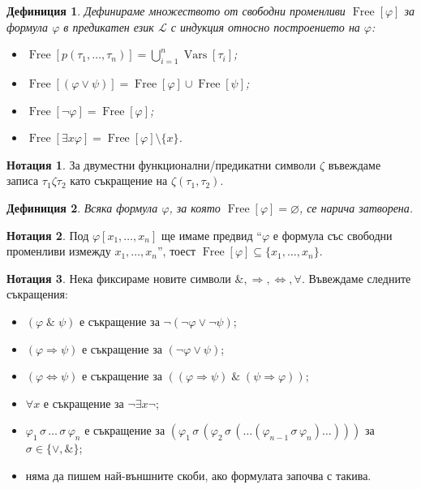 \documentclass[12pt]{article}
\newcommand{\vars}{\operatorname{Vars}}
\newcommand{\free}{\operatorname{Free}}
\newcommand{\logand}{\; \& \;}
\newcommand{\calL}{\mathcal{L}}
\newtheorem*{definition}{Дефиниция}
\theoremstyle{definition}
\newtheorem*{notation}{Нотация}
\begin{document}
\newpage

\begin{definition}
	Дефинираме множеството от свободни променливи $\free[\varphi]$ за формула $\varphi$ в предикатен език $\calL$ с индукция относно построението на $\varphi$:
	\begin{itemize}
		\item $\free[p(\tau_1, \dots, \tau_n)] = \bigcup\limits_{i = 1}^n \vars[\tau_i]$;
		\item $\free[(\varphi \lor \psi)] = \free[\varphi] \cup \free[\psi]$;
		\item $\free[\neg \varphi] = \free[\varphi]$;
		\item $\free[\exists x \varphi] = \free[\varphi] \setminus \{ x \}$.
	\end{itemize}
\end{definition}

\begin{notation}
	За двуместни функционални/предикатни символи $\zeta$ въвеждаме записа $\tau_1 \zeta \tau_2$ като съкращение на $\zeta(\tau_1, \tau_2)$.
\end{notation}

\begin{definition}
	Всяка формула $\varphi$, за която $\free[\varphi] = \varnothing$, се нарича затворена.
\end{definition}

\begin{notation}
	Под $\varphi[x_1, \dots, x_n]$ ще имаме предвид ``$\varphi$ е формула със свободни променливи измежду $x_1, \dots, x_n$'', тоест $\free[\varphi] \subseteq \{ x_1, \dots, x_n \}$.
\end{notation}

\begin{notation}
	Нека фиксираме новите символи $\&, \Rightarrow, \Leftrightarrow, \forall$.
	Въвеждаме следните съкращения:
	\begin{itemize}
		\item $(\varphi \logand \psi)$ е съкращение за $\neg (\neg \varphi \lor \neg \psi)$;
		\item $(\varphi \Rightarrow \psi)$ е съкращение за $(\neg \varphi \lor \psi)$;
		\item $(\varphi \Leftrightarrow \psi)$ е съкращение за $((\varphi \Rightarrow \psi) \logand (\psi \Rightarrow \varphi))$;
		\item $\forall x$ е съкращение за $\neg \exists x \neg$;
		\item $\varphi_1 \, \sigma \, \dots \, \sigma \, \varphi_n$ е съкращение за $(\varphi_1 \, \sigma \, (\varphi_2 \, \sigma \, (\dots (\varphi_{n - 1} \, \sigma \, \varphi_n) \dots )))$ за $\sigma \in \{ \lor, \& \}$;
		\item няма да пишем най-външните скоби, ако формулата започва с такива.
	\end{itemize}
\end{notation}
\end{document}

